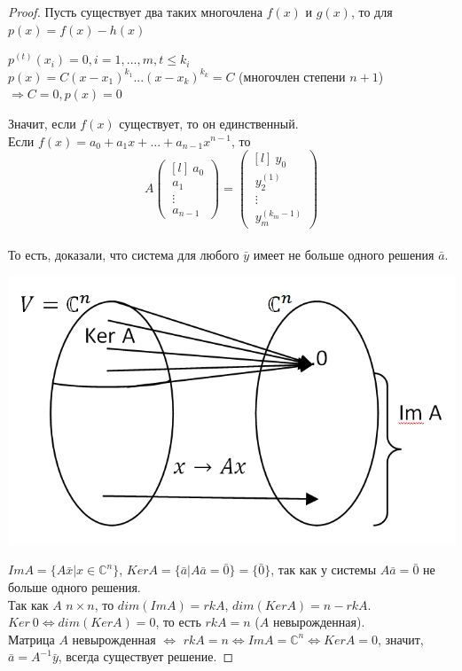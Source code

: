 \begin{proof}
Пусть существует два таких многочлена $f(x)$ и $g(x)$, то для $p(x) = f(x)-h(x)$
\begin{center}
    $p^{(t)}(x_i) = 0, i=1,...,m, t\leq k_i$\\
    $p(x) = C(x-x_1)^{k_1}...(x-x_k)^{k_k} = C$ (многочлен степени $n+1$)\\
    $\Rightarrow C = 0, p(x) = 0$
\end{center}
Значит, если $f(x)$ существует, то он единственный.\\
Если $f(x) = a_0+a_1x+...+a_{n-1}x^{n-1}$, то \\
\[A \begin{pmatrix}[l]
~a_0 \\
~a_1 \\
~\vdots\\
~a_{n-1}
\end{pmatrix} = \begin{pmatrix}[l]
~y_0 \\
~y_2^{(1)}\\
~\vdots\\
~y_m^{(k_m-1)}
\end{pmatrix}\]\\
То есть, доказали, что система для любого $\bar y$ имеет не больше одного решения $\bar a$.\begin{center}
    \includegraphics[scale=0.4]{l3_2.png}\end{center}
$Im A = \{ A \bar x | x\in \mathbb{C}^n \} $, 
$Ker A = \{\bar a | A \bar a = \bar 0 \} = \{\bar 0 \} $, так как у системы $A \bar a = \bar 0$ не больше одного решения.\\
Так как $A$ $n \times n$, то 
$dim(Im A) = rk A$, $dim(Ker A) = n-rk A$.\\ 
$Ker~ 0 \Leftrightarrow dim(Ker A) = 0$, то есть $rk A = n$ ($A$ невырожденная). \\
Матрица $A$ невырожденная $\Leftrightarrow$ $rk A = n \Leftrightarrow Im A = \mathbb{C}^n \Leftrightarrow Ker A = 0$, значит, $\bar a = A^{-1}\bar y$, всегда существует решение. 
\end{proof}
